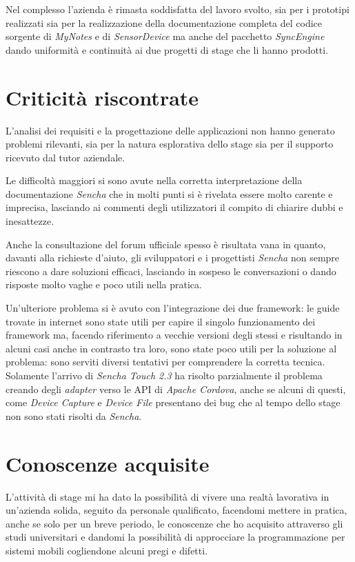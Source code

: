 Nel complesso l'azienda è rimasta soddisfatta del lavoro svolto, sia per i prototipi realizzati sia per la realizzazione della documentazione completa del codice sorgente di \emph{MyNotes} e di \emph{SensorDevice} ma anche del pacchetto \emph{SyncEngine} dando uniformità e continuità ai due progetti di stage che li hanno prodotti.

\section{Criticità riscontrate}
L'analisi dei requisiti e la progettazione delle applicazioni non hanno generato problemi rilevanti, sia per la natura esplorativa dello stage sia per il supporto ricevuto dal tutor aziendale.

Le difficoltà maggiori si sono avute nella corretta interpretazione della documentazione \emph{Sencha} che in molti punti si è rivelata essere molto carente e imprecisa, lasciando ai commenti degli utilizzatori il compito di chiarire dubbi e inesattezze.

Anche la consultazione del forum ufficiale spesso è risultata vana in quanto, davanti alla richieste d'aiuto, gli sviluppatori e i progettisti \emph{Sencha} non sempre riescono a dare soluzioni efficaci, lasciando in sospeso le conversazioni o dando risposte molto vaghe e poco utili nella pratica.

Un'ulteriore problema si è avuto con l'integrazione dei due framework: le guide trovate in internet sono state utili per capire il singolo funzionamento dei framework ma, facendo riferimento a vecchie versioni degli stessi e risultando in alcuni casi anche in contrasto tra loro, sono state poco utili per la soluzione al problema: sono serviti diversi tentativi per comprendere la corretta tecnica.
Solamente l'arrivo di \emph{Sencha Touch 2.3} ha risolto parzialmente il problema creando degli \emph{adapter} verso le \ac{API} di \emph{Apache Cordova}, anche se alcuni di questi, come \emph{Device Capture} e \emph{Device File} presentano dei bug che al tempo dello stage non sono stati risolti da \emph{Sencha}.

\section{Conoscenze acquisite}
L'attività di stage mi ha dato la possibilità di vivere una realtà lavorativa in un'azienda solida, seguito da personale qualificato, facendomi mettere in pratica, anche se solo per un breve periodo, le conoscenze che ho acquisito attraverso gli studi universitari e dandomi la possibilità di approcciare la programmazione per sistemi mobili cogliendone alcuni pregi e difetti.

